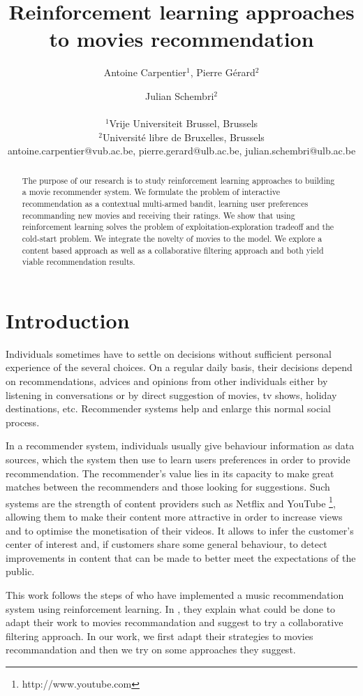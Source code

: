\documentclass[letterpaper]{article}
\title{Reinforcement learning approaches to movies recommendation}
\author{Antoine Carpentier$^{1}$, Pierre Gérard$^{2}$ \and Julian Schembri$^2$ \\
\mbox{}\\
$^1$Vrije Universiteit Brussel, Brussels \\
$^2$Université libre de Bruxelles, Brussels \\
antoine.carpentier@vub.ac.be, pierre.gerard@ulb.ac.be, julian.schembri@ulb.ac.be}
\begin{document}
\maketitle

\begin{abstract}
  The purpose of our research is to study reinforcement learning approaches to building a movie recommender system. We formulate the problem of interactive recommendation as a contextual multi-armed bandit, learning user preferences recommanding new movies and receiving their ratings. We show that using reinforcement learning solves the problem of exploitation-exploration tradeoff and the cold-start problem. We integrate the novelty of movies to the model. We explore a content based approach as well as a collaborative filtering approach and both yield viable recommendation results.
\end{abstract}

\section{Introduction}


Individuals sometimes have to settle on decisions without sufficient personal experience of the several choices. On a regular daily basis, their decisions depend on recommendations, advices and opinions from other individuals either by listening in conversations or by direct suggestion of movies, tv shows, holiday destinations, etc. Recommender systems help and enlarge this normal social process.

In a recommender system, individuals usually give behaviour information as data sources, which the system then use to learn users preferences in order to provide recommendation. The recommender's value lies in its capacity to make great matches between the recommenders and those looking for suggestions. Such systems are the strength of content providers such as Netflix \cite{netflix-article-recommender} and YouTube \footnote{http://www.youtube.com}, allowing them to make their content more attractive in order to increase views and to optimise the monetisation of their videos. It allows to infer the customer's center of interest and, if customers share some general behaviour, to detect improvements in content that can be made to better meet the expectations of the public. 


This work follows the steps of \cite{main} who have implemented a music recommendation system using reinforcement learning. In \cite{main}, they explain what could be done to adapt their work to movies recommandation and suggest to try a collaborative filtering approach. In our work, we first adapt their strategies to movies recommandation and then we try on some approaches they suggest.
\end{document}
